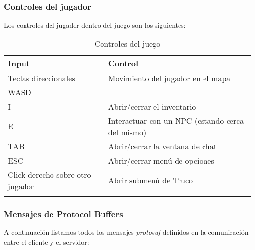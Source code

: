 
\subsubsection{Controles del jugador}

\noindent Los controles del jugador dentro del juego son los siguientes:

\label{ref:game-controls}
\begin{longtable}{|l|l|}
    \hline
    \textbf{Input} & \textbf{Control}\\
    \hline
    Teclas direccionales & Movimiento del jugador en el mapa \\
    WASD                 &  \\
    \hline
    I                    & Abrir/cerrar el inventario \\
    \hline
    E                    & Interactuar con un NPC (estando cerca del mismo) \\
    \hline
    TAB                  & Abrir/cerrar la ventana de chat \\
    \hline
    ESC                    & Abrir/cerrar menú de opciones \\
    \hline
    Click derecho sobre otro jugador & Abrir submenú de Truco \\
    \hline
    \caption{Controles del juego}\\
\end{longtable}

\subsubsection{Mensajes de Protocol Buffers}

\noindent A continuación listamos todos los mensajes \textit{protobuf} definidos
en la comunicación entre el cliente y el servidor:

